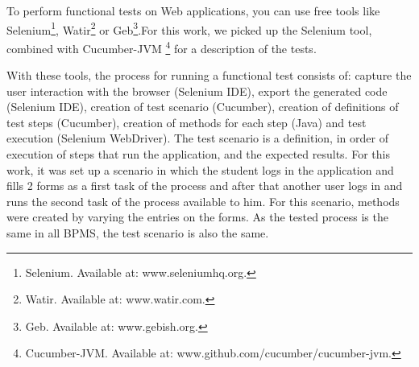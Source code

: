 \documentclass[runningheads,a4paper]{llncs}
\begin{document}
To perform functional tests on Web applications, you can use free tools like Selenium\footnote{Selenium. Available at: www.seleniumhq.org.}, Watir\footnote{Watir. Available at: www.watir.com.} or Geb\footnote{Geb. Available at: www.gebish.org.}.For this work, we picked up the Selenium tool, combined with Cucumber-JVM \footnote{Cucumber-JVM. Available at: www.github.com/cucumber/cucumber-jvm.} for a description of the tests. %


With these tools, the process for running a functional test consists of: capture the user interaction with the browser (Selenium IDE), export the generated code (Selenium IDE), creation of test scenario (Cucumber), creation of definitions of test steps (Cucumber), creation of methods for each step (Java) and test execution (Selenium WebDriver). The test scenario is a definition, in order of execution of steps that run the application, and the expected results. For this work, it was set up a scenario in which the student logs in the application and fills 2 forms as a first task of the process and after that another user logs in and runs the second task of the process available to him. For this scenario, methods were created by varying the entries on the forms. As the tested process is the same in all BPMS, the test scenario is also the same.
\end{document}
